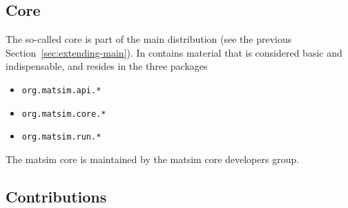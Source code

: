 \subsection{Core}
\label{sec:extending-core}

The so-called core is part of the main distribution (see the previous Section~\ref{sec:extending-main}).  In contains material that is considered basic and indispensable, and resides in the three packages
\begin{itemize}\styleItemize
\item \lstinline{org.matsim.api.*}
\item \lstinline{org.matsim.core.*}
\item \lstinline{org.matsim.run.*}
\end{itemize}
%
The \gls{matsim} core is maintained by the \gls{matsim} core developers group.

 


\subsection{Contributions}

